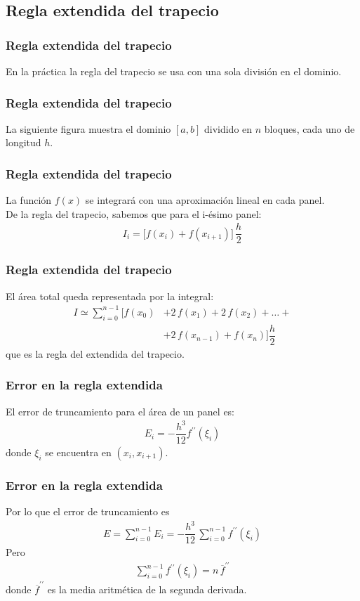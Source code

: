 \subsection{Regla extendida del trapecio}
\begin{frame}
\frametitle{Regla extendida del trapecio}
En la práctica la regla del trapecio se usa con una sola división en el dominio.
\end{frame}
\begin{frame}
\frametitle{Regla extendida del trapecio}
La siguiente figura muestra el dominio $[a,b]$ dividido en $n$ bloques, cada uno de longitud $h$.
\begin{figure}
	\centering
	
\end{figure}
\end{frame}
\begin{frame}
\frametitle{Regla extendida del trapecio}
La función $f(x)$ se integrará con una aproximación lineal en cada panel. 
\\
\bigskip
\pause
De la regla del trapecio, sabemos que para el i-ésimo panel:
\begin{align*}
I_{i} = \bigg[ f(x_{i}) + f(x_{i+1}) \bigg] \, \dfrac{h}{2}
\end{align*}
\end{frame}
\begin{frame}
\frametitle{Regla extendida del trapecio}
El área total queda representada por la integral:
\begin{align*}
I \simeq \sum_{i=0}^{n-1} \bigg[f(x_{0}) &+ 2 \, f(x_{1}) + 2 \, f(x_{2}) + \ldots + \\ 
&+ 2 \, f(x_{n-1}) + f(x_{n}) \bigg] \dfrac{h}{2}
\end{align*}
que es la regla del extendida del trapecio.
\end{frame}
\begin{frame}
\frametitle{Error en la regla extendida}
El error de truncamiento para el área de un panel es:
\begin{align*}
E_{i} = - \dfrac{h^{3}}{12} f^{\prime \prime} (\xi_{i})
\end{align*}
donde $\xi_{i}$ se encuentra en $(x_{i}, x_{i+1})$.
\end{frame}
\begin{frame}
\frametitle{Error en la regla extendida}
Por lo que el error de truncamiento es
\begin{align*}
E = \sum_{i=0}^{n-1} E_{i} = - \dfrac{h^{3}}{12} \, \sum_{i=0}^{n-1} f^{\prime \prime} (\xi_{i})
\end{align*}
\pause
Pero
\begin{align*}
\sum_{i=0}^{n-1} f^{\prime \prime} (\xi_{i}) = n \, \overline{f}^{\prime \prime}
\end{align*}
donde $\overline{f}^{\prime \prime}$ es la media aritmética de la segunda derivada.
\end{frame}
